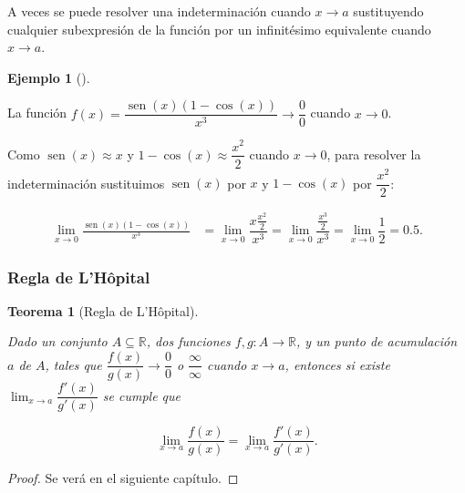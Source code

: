 \documentclass[
  a4paper,
]{scrreport}
\theoremstyle{definition}
\theoremstyle{plain}
\newtheorem{theorem}{Teorema}[chapter]
\theoremstyle{plain}
\theoremstyle{definition}
\theoremstyle{definition}
\newtheorem{example}{Ejemplo}[chapter]
\theoremstyle{plain}
\theoremstyle{remark}
\begin{document}
A veces se puede resolver una indeterminación cuando \(x\to a\)
sustituyendo cualquier subexpresión de la función por un infinitésimo
equivalente cuando \(x\to a\).

\begin{example}[]\protect\hypertarget{exm-infinitesimo-equivalente}{}\label{exm-infinitesimo-equivalente}

La función
\(f(x)=\dfrac{\operatorname{sen}(x)(1- \cos(x))}{x^3}\to \dfrac{0}{0}\)
cuando \(x\to 0\).

Como \(\operatorname{sen}(x) \approx x\) y
\(1-\cos(x)\approx \dfrac{x^2}{2}\) cuando \(x\to 0\), para resolver la
indeterminación sustituimos \(\operatorname{sen}(x)\) por \(x\) y
\(1-\cos(x)\) por \(\dfrac{x^2}{2}\):

\begin{align*}
\lim_{x\to 0}\frac{\operatorname{sen}(x)(1- \cos (x))}{x^3}&=
\lim_{x\to 0}\dfrac{x\frac{x^2}{2}}{x^3} =
\lim_{x\to 0}\dfrac{\frac{x^3}{2}}{x^3} = \lim_{x\to 0}\dfrac{1}{2} =0.5.
\end{align*}

\end{example}

\hypertarget{regla-de-lhuxf4pital}{%
\subsubsection{Regla de L'Hôpital}\label{regla-de-lhuxf4pital}}

\begin{theorem}[Regla de
L'Hôpital]\protect\hypertarget{thm-regla-lhopital}{}\label{thm-regla-lhopital}

Dado un conjunto \(A\subseteq \mathbb{R}\), dos funciones
\(f,g:A\to \mathbb{R}\), y un punto de acumulación \(a\) de \(A\), tales
que \(\dfrac{f(x)}{g(x)}\to \dfrac{0}{0}\) o \(\dfrac{\infty}{\infty}\)
cuando \(x\to a\), entonces si existe
\(\lim_{x\to a}\dfrac{f'(x)}{g'(x)}\) se cumple que

\[
\lim_{x\to a}\frac{f(x)}{g(x)}=\lim_{x\to a}\frac{f'(x)}{g'(x)}.
\]

\end{theorem}

\begin{tcolorbox}[enhanced jigsaw, breakable, title=\textcolor{quarto-callout-note-color}{\faInfo}\hspace{0.5em}{Demostración}, toprule=.15mm, coltitle=black, arc=.35mm, rightrule=.15mm, colframe=quarto-callout-note-color-frame, colbacktitle=quarto-callout-note-color!10!white, toptitle=1mm, titlerule=0mm, leftrule=.75mm, opacityback=0, colback=white, bottomrule=.15mm, bottomtitle=1mm, left=2mm, opacitybacktitle=0.6]

\begin{proof}

Se verá en el siguiente capítulo.

\end{proof}

\end{tcolorbox}
\end{document}

